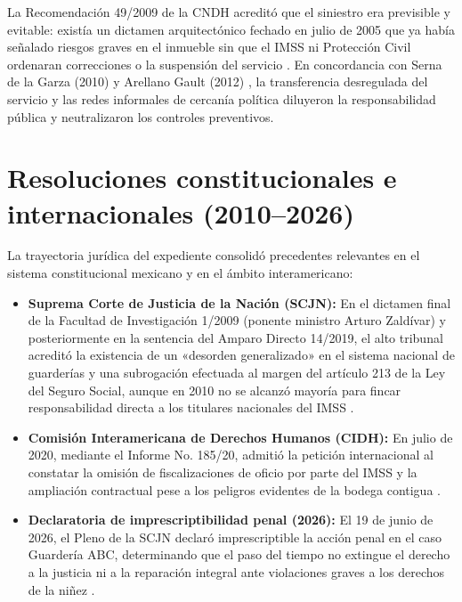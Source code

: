 La Recomendación 49/2009 de la CNDH acreditó que el siniestro era previsible y evitable: existía un dictamen arquitectónico fechado en julio de 2005 que ya había señalado riesgos graves en el inmueble sin que el IMSS ni Protección Civil ordenaran correcciones o la suspensión del servicio \citep{cndh2009}. En concordancia con Serna de la Garza (2010) y Arellano Gault (2012) \citep{arellano2012}, la transferencia desregulada del servicio y las redes informales de cercanía política diluyeron la responsabilidad pública y neutralizaron los controles preventivos.

\section{Resoluciones constitucionales e internacionales (2010--2026)}

La trayectoria jurídica del expediente consolidó precedentes relevantes en el sistema constitucional mexicano y en el ámbito interamericano:

\begin{itemize}
  \item \textbf{Suprema Corte de Justicia de la Nación (SCJN):} En el dictamen final de la Facultad de Investigación 1/2009 (ponente ministro Arturo Zaldívar) y posteriormente en la sentencia del Amparo Directo 14/2019, el alto tribunal acreditó la existencia de un «desorden generalizado» en el sistema nacional de guarderías y una subrogación efectuada al margen del artículo 213 de la Ley del Seguro Social, aunque en 2010 no se alcanzó mayoría para fincar responsabilidad directa a los titulares nacionales del IMSS \citep{scjn2010,scjn2025,zaldivar2010}.
  
  \item \textbf{Comisión Interamericana de Derechos Humanos (CIDH):} En julio de 2020, mediante el Informe No. 185/20, admitió la petición internacional al constatar la omisión de fiscalizaciones de oficio por parte del IMSS y la ampliación contractual pese a los peligros evidentes de la bodega contigua \citep{cidh2020}.
  
  \item \textbf{Declaratoria de imprescriptibilidad penal (2026):} El 19 de junio de 2026, el Pleno de la SCJN declaró imprescriptible la acción penal en el caso Guardería ABC, determinando que el paso del tiempo no extingue el derecho a la justicia ni a la reparación integral ante violaciones graves a los derechos de la niñez \citep{nunez2026}.
\end{itemize}


